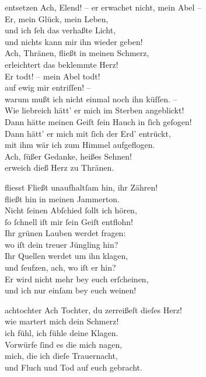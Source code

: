 \documentclass[tocstyle=ref-genre]{ees}
\begin{document}
{\begin{movement}{entsetzen}
  \voice[Thirza]
  Ach, Elend! – er erwachet nicht, mein Abel –\\
  Er, mein Glück, mein Leben,\\
  und ich ſeh das verhaßte Licht,\\
  und nichts kann mir ihn wieder geben!\\
  Ach, Thränen, fließt in meinen Schmerz,\\
  erleichtert das beklemmte Herz!\\
  Er todt! – mein Abel todt!\\
  auf ewig mir entriſſen! –\\
  warum mußt ich nicht einmal noch ihn küſſen. –\\
  Wie liebreich hätt’ er mich im Sterben angeblickt!\\
  Dann hätte meinen Geiſt ſein Hauch in ſich geſogen!\\
  Dann hätt’ er mich mit ſich der Erd’ entrückt,\\
  mit ihm wär ich zum Himmel aufgeflogen.\\
  Ach, ſüßer Gedanke, heißes Sehnen!\\
  erweich dieß Herz zu Thränen.
\end{movement}

\begin{movement}{fliesst}
  \voice[Thirza]
  Fließt unaufhaltſam hin, ihr Zähren!\\
  fließt hin in meinen Jammerton.\\
  Nicht ſeinen Abſchied ſollt ich hören,\\
  ſo ſchnell iſt mir ſein Geiſt entflohn!\\
  Ihr grünen Lauben werdet fragen:\\
  wo iſt dein treuer Jüngling hin?\\
  Ihr Quellen werdet um ihn klagen,\\
  und ſeufzen, ach, wo iſt er hin?\\
  Er wird nicht mehr bey euch erſcheinen,\\
  und ich nur einſam bey euch weinen!
\end{movement}

\begin{movement}{achtochter}
  \voice[Eva]
  Ach Tochter, du zerreißeſt dieſes Herz!\\
  wie martert mich dein Schmerz!\\
  ich fühl, ich fühle deine Klagen.\\
  Vorwürfe ſind es die mich nagen,\\
  mich, die ich dieſe Trauernacht,\\
  und Fluch und Tod auf euch gebracht.


\end{movement}}
\end{document}
